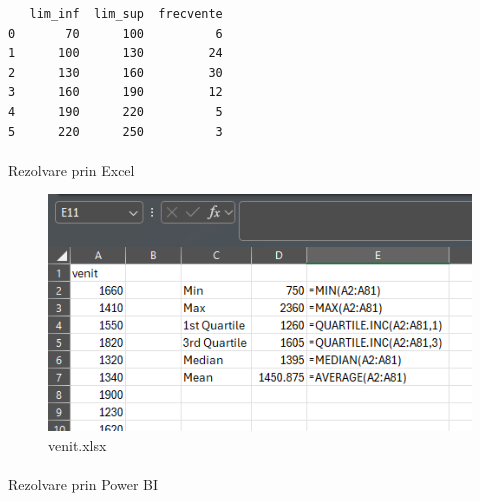 \documentclass[
  11pt,
  b5paper,
  nottoc]{book}
\makeatletter
\let\oldparagraph\paragraph
\renewcommand{\paragraph}{
    \@ifstar
      \xxxParagraphStar
      \xxxParagraphNoStar
  }
\newcommand{\xxxParagraphStar}[1]{\oldparagraph*{#1}\mbox{}}
\newcommand{\xxxParagraphNoStar}[1]{\oldparagraph{#1}\mbox{}}
\makeatother
\begin{document}
\begin{verbatim}
   lim_inf  lim_sup  frecvente
0       70      100          6
1      100      130         24
2      130      160         30
3      160      190         12
4      190      220          5
5      220      250          3
\end{verbatim}

\paragraph{Rezolvare prin Excel}\label{rezolvare-prin-excel-1}

\begin{figure}[H]

{\centering \includegraphics{date/medie_simpla.PNG}

}

\caption{venit.xlsx}

\end{figure}%

\paragraph{Rezolvare prin Power BI}\label{rezolvare-prin-power-bi-1}
\end{document}
